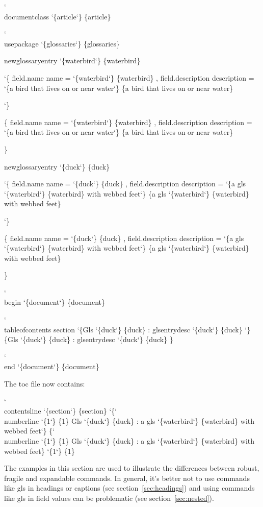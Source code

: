 \documentclass[titlepage=false,fontsize=12pt,captions=tableheading]{scrreprt}
\makeatletter
\newcommand*{\csfmtfont}[1]{\texttt{#1}}
\newcommand*{\abbrstylefmt}[1]{\texorpdfstring{\textsf{\color{style}#1}}{#1}}
\newcommand*{\catattrfmt}[1]{\texorpdfstring{\textsf{\color{attribute}#1}}{#1}}
\newcommand*{\marg}[1]{\texorpdfstring
 {\discretionary{}{}{}\char`\{#1\char`\} }%
 {\{#1\}}%
}
\newenvironment{codeenv}
 {%
 \renewcommand{\glslinkpresetkeys}{\setkeys{glslink}{noindex}}%
   \def\cmd{\char`\\}%
   \def\comment##1{\textcolor{comment}{\%\ ##1}}%
   \renewcommand*{\catattrfmt}[1]{\textcolor{attribute}{##1}}%
   \renewcommand*{\abbrstylefmt}[1]{\textcolor{style}{##1}}%
   \renewcommand*{\csfmtfont}[1]{\textcolor{cs}{##1}}%
    \begin{flushleft}\textcolor{lightgray}{\hrulefill}\par\nopagebreak
     \medskip\nopagebreak
     \ttfamily\obeylines\frenchspacing\@vobeyspaces}
 {\nopagebreak\textcolor{lightgray}{\hrulefill}%
  \end{flushleft}\ignorespacesafterend}
\newcommand{\idx}{\gls}
\newcommand{\ext}{\gls}
\newcommand*{\field}[1]{%
 \texorpdfstring
 {\gls{field.#1}}%
 {#1}%
}
\newlength\borderedboxwidth
\newenvironment{important}{%
  \setlength{\fboxrule}{4pt}%
  \setlength\borderedboxwidth{\linewidth}%
  \addtolength\borderedboxwidth{-2\fboxsep}%
  \addtolength\borderedboxwidth{-2\fboxrule}%
  \begin{lrbox}{\borderedboxcontents}%
    \begin{minipage}{\borderedboxwidth}%
    \raggedright
    \setlength\parindent{1em}%
    \noindent\ignorespaces
}%
{%
    \end{minipage}%
  \end{lrbox}%
  \par\vskip10pt\noindent
  \fcolorbox{red}{white}{\usebox{\borderedboxcontents}}\par\vskip10pt
  \noindent\ignorespacesafterend
}
\newcommand*{\sectionref}[1]{section~\ref{#1}}
\let\texorpdfstring\@secondoftwo
\makeatother
\begin{document}
\begin{codeenv}
\cmd{documentclass}\marg{article}
\strut
\cmd{usepackage}\marg{glossaries}
\strut
\gls{newglossaryentry}\marg{waterbird}
\marg{
  \field{name}=\marg{waterbird},
  \field{description}=\marg{a bird that lives on or near water}
}
\strut
\gls{newglossaryentry}\marg{duck}
\marg{
  \field{name}=\marg{duck},
  \field{description}=\marg{a \gls{gls}\marg{waterbird} with webbed feet}
}
\strut
\cmd{begin}\marg{document}
\cmd{tableofcontents}
\gls{section}\marg{\gls{Gls}\marg{duck}: \gls{glsentrydesc}\marg{duck}}
\cmd{end}\marg{document}
\end{codeenv}
The \ext{toc} file now contains:
\begin{codeenv}
\cmd{contentsline} \marg{section}\marg{\cmd{numberline} \marg{1}\gls{Gls} \marg{duck}: a \gls{gls} \marg{waterbird} with webbed feet}\marg{1}
\end{codeenv}

\begin{important}
The examples in this section are used to illustrate the differences
between \idx{robust}, \idx{fragile} and \idx{expandable} commands.
In general, it's better not to use commands like \gls{gls} in
headings or captions (see \sectionref{sec:headings}) and using
commands like \gls{gls} in field values can be problematic (see
\sectionref{sec:nested}).
\end{important}
\end{document}
